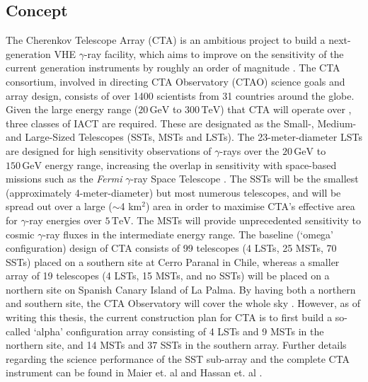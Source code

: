 \subsection{Concept}
The Cherenkov Telescope Array (CTA) is an ambitious project to build a next-generation VHE $\gamma$-ray facility, which aims to improve on the sensitivity of the current generation instruments by roughly an order of magnitude \cite{scienceCTA}. The CTA consortium, involved in directing CTA Observatory (CTAO) science goals and array design, consists of over 1400 scientists from 31 countries around the globe. Given the large energy range ($\mathrm{20\,GeV}$ to $\mathrm{300\,TeV}$) that CTA will operate  over \cite{scienceCTA}, three classes of IACT are required. These are designated as the Small-, Medium- and Large-Sized Telescopes (SSTs, MSTs and LSTs). The 23-meter-diameter LSTs are designed for high sensitivity observations of $\gamma$-rays over the $\mathrm{20\,GeV}$ to $\mathrm{150\,GeV}$ energy range, increasing the overlap in sensitivity with space-based missions such as the \textit{Fermi} $\gamma$-ray Space Telescope \cite{Fermi}. The SSTs will be the smallest (approximately 4-meter-diameter) but most numerous telescopes, and will be spread out over a large ($\sim$4 km$^2$) area in order to maximise CTA's effective area for $\gamma$-ray energies over $\mathrm{5\,TeV}$. The MSTs will provide unprecedented sensitivity to cosmic $\gamma$-ray fluxes in the intermediate energy range. The baseline (`omega' configuration) design of CTA consists of 99 telescopes (4 LSTs, 25 MSTs, 70 SSTs) placed on a southern site at Cerro Paranal in Chile, whereas a smaller array of 19 telescopes (4 LSTs, 15 MSTs, and no SSTs) will be placed on a northern site on Spanish Canary Island of La Palma. By having both a northern and southern site, the CTA Observatory will cover the whole sky \cite{scienceCTA}. However, as of writing this thesis, the current construction plan for CTA is to first build a so-called `alpha' configuration array consisting of 4 LSTs and 9 MSTs in the northern site, and 14 MSTs and 37 SSTs in the southern array. Further details regarding the science performance of the SST sub-array and the complete CTA instrument can be found in Maier et. al \cite{gernotCTA} and Hassan et. al \cite{tarekCTA}.
